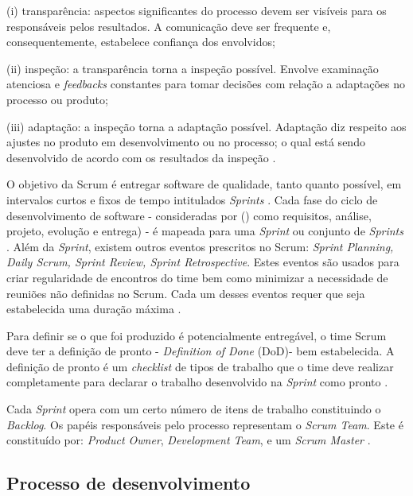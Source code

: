 \par (i) transparência: aspectos significantes do processo devem ser visíveis para os responsáveis pelos resultados. A comunicação deve ser frequente e, consequentemente, estabelece confiança dos envolvidos;
\par (ii) inspeção: a transparência torna a inspeção possível. Envolve examinação atenciosa e \textit{feedbacks} constantes para tomar decisões com relação a adaptações no processo ou produto;
\par (iii) adaptação: a inspeção torna a adaptação possível. Adaptação diz respeito aos ajustes no produto em desenvolvimento ou no processo; o qual está sendo desenvolvido de acordo com os resultados da inspeção \cite{rubin2012}.

O objetivo da Scrum é entregar software de qualidade, tanto quanto possível, em intervalos curtos e fixos de tempo intitulados \textit{Sprints} \cite{beedle1999}. Cada fase do ciclo de desenvolvimento de software - consideradas por \citeauthor{beedle1999} (\citeyear{beedle1999}) como requisitos, análise, projeto, evolução e entrega) - é mapeada para uma \textit{Sprint} ou conjunto de \textit{Sprints} \cite{beedle1999}. Além da \textit{Sprint}, existem outros eventos prescritos no Scrum: \textit{Sprint Planning, Daily Scrum, Sprint Review, Sprint Retrospective}. Estes eventos são usados para criar regularidade de encontros do time bem como minimizar a necessidade de reuniões não definidas no Scrum. Cada um desses eventos requer que seja estabelecida uma duração máxima \cite{beedle1999}.

Para definir se o que foi produzido é potencialmente entregável, o time Scrum deve ter a definição de pronto - \textit{Definition of Done} (DoD)- bem estabelecida. A definição de pronto é um \textit{checklist} de tipos de trabalho que o time deve realizar completamente para declarar o trabalho desenvolvido na \textit{Sprint} como pronto \cite{rubin2012}.

Cada \textit{Sprint} opera com um certo número de itens de trabalho constituindo o \textit{Backlog}. Os papéis responsáveis pelo processo representam o \textit{Scrum Team}. Este é constituído por: \textit{Product Owner}, \textit{Development Team}, e um \textit{Scrum Master} \cite{beedle1999}.




\subsection{Processo de desenvolvimento}

